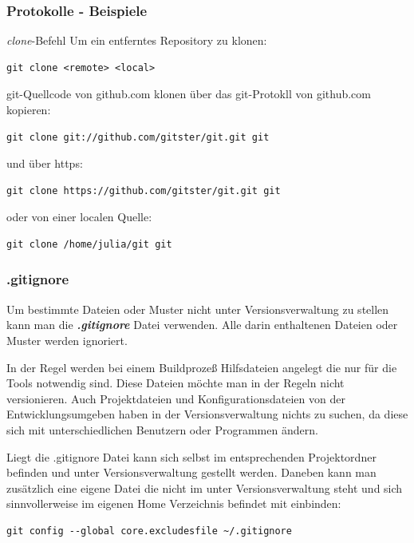 \documentclass{beamer}
\begin{document}
\begin{frame}[fragile]\frametitle{Protokolle - Beispiele}
\begin{block} {\textit{clone}-Befehl}
Um ein entferntes Repository zu klonen:
\begin{lstlisting}
git clone <remote> <local>
\end{lstlisting}
\end{block}
\begin{exampleblock} {git-Quellcode von github.com klonen}
über das git-Protokll von github.com kopieren:
\begin{lstlisting}
git clone git://github.com/gitster/git.git git
\end{lstlisting}
und über https:
\begin{lstlisting}
git clone https://github.com/gitster/git.git git
\end{lstlisting}
oder von einer localen Quelle:
\begin{lstlisting}
git clone /home/julia/git git
\end{lstlisting}
\end{exampleblock}
\end{frame}

\begin{frame}[fragile]\frametitle{.gitignore}
\begin{footnotesize}
Um bestimmte Dateien oder Muster nicht unter Versionsverwaltung zu stellen kann man die \textbf{\textit{.gitignore}} Datei verwenden. Alle darin enthaltenen Dateien oder Muster werden ignoriert.

In der Regel werden bei einem Buildprozeß Hilfsdateien angelegt die nur für die Tools notwendig sind. Diese Dateien möchte man in der Regeln nicht versionieren. Auch Projektdateien und Konfigurationsdateien von der Entwicklungsumgeben haben in der Versionsverwaltung nichts zu suchen, da diese sich mit unterschiedlichen Benutzern oder Programmen ändern. 

Liegt die .gitignore Datei kann sich selbst im entsprechenden Projektordner 
befinden und unter Versionsverwaltung gestellt werden. Daneben kann man zusätzlich
eine eigene Datei die nicht im unter Versionsverwaltung steht und sich sinnvollerweise im eigenen Home
Verzeichnis befindet mit einbinden: 
\end{footnotesize}
\begin{lstlisting}
git config --global core.excludesfile ~/.gitignore
\end{lstlisting}
\end{frame}
\end{document}
